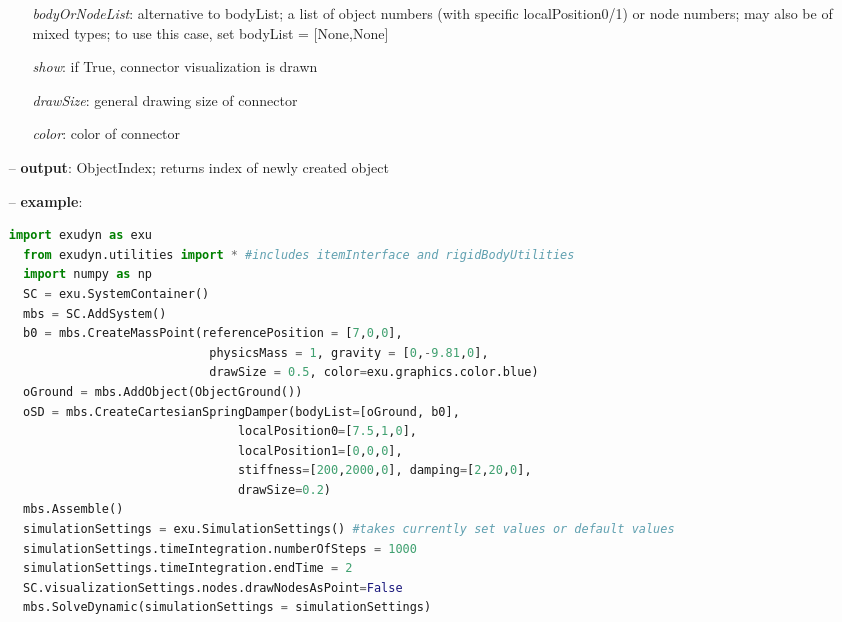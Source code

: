 \begin{itemize}[leftmargin=0.7cm]
\begin{itemize}[leftmargin=1.2cm]
\item[]{\it bodyOrNodeList}: alternative to bodyList; a list of object numbers (with specific localPosition0/1) or node numbers; may also be of mixed types; to use this case, set bodyList = [None,None]
\item[]{\it show}: if True, connector visualization is drawn
\item[]{\it drawSize}: general drawing size of connector
\item[]{\it color}: color of connector
\end{itemize}
\item[--]
{\bf output}: ObjectIndex; returns index of newly created object
\item[--]
{\bf example}: \vspace{-12pt}\ei\begin{lstlisting}[language=Python, xleftmargin=36pt]
  import exudyn as exu
  from exudyn.utilities import * #includes itemInterface and rigidBodyUtilities
  import numpy as np
  SC = exu.SystemContainer()
  mbs = SC.AddSystem()
  b0 = mbs.CreateMassPoint(referencePosition = [7,0,0],
                            physicsMass = 1, gravity = [0,-9.81,0],
                            drawSize = 0.5, color=exu.graphics.color.blue)
  oGround = mbs.AddObject(ObjectGround())
  oSD = mbs.CreateCartesianSpringDamper(bodyList=[oGround, b0],
                                localPosition0=[7.5,1,0],
                                localPosition1=[0,0,0],
                                stiffness=[200,2000,0], damping=[2,20,0],
                                drawSize=0.2)
  mbs.Assemble()
  simulationSettings = exu.SimulationSettings() #takes currently set values or default values
  simulationSettings.timeIntegration.numberOfSteps = 1000
  simulationSettings.timeIntegration.endTime = 2
  SC.visualizationSettings.nodes.drawNodesAsPoint=False
  mbs.SolveDynamic(simulationSettings = simulationSettings)
\end{lstlisting}\vspace{-24pt}\bi\item[]\vspace{-24pt}\vspace{12pt}\end{itemize}
%

